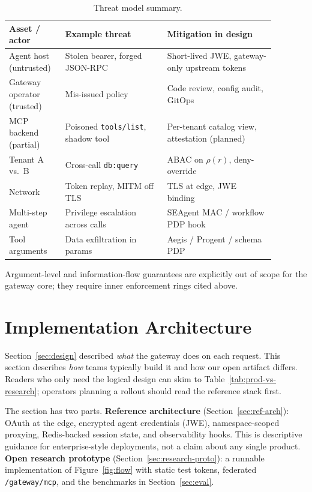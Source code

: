 \documentclass[11pt]{article}
\newcommand{\code}[1]{\texttt{#1}}
\newcommand{\aegis}{Aegis}
\newcommand{\seagent}{SEAgent}
\begin{document}
\begin{table}[H]
\centering
\caption{Threat model summary.}
\label{tab:threat}
\footnotesize
\begin{tabular}{@{}p{0.18\linewidth}p{0.34\linewidth}p{0.36\linewidth}@{}}
\toprule
Asset / actor & Example threat & Mitigation in design \\
\midrule
Agent host (untrusted) & Stolen bearer, forged JSON-RPC & Short-lived JWE, gateway-only upstream tokens \\
Gateway operator (trusted) & Mis-issued policy & Code review, config audit, GitOps \\
MCP backend (partial) & Poisoned \code{tools/list}, shadow tool & Per-tenant catalog view, attestation (planned) \\
Tenant A vs.\ B & Cross-call \code{db:query} & ABAC on $\rho(r)$, deny-override \\
Network & Token replay, MITM off TLS & TLS at edge, JWE binding \\
Multi-step agent & Privilege escalation across calls & \seagent{} MAC / workflow PDP hook \\
Tool arguments & Data exfiltration in params & \aegis{} / Progent / schema PDP \\
\bottomrule
\end{tabular}
\end{table}

Argument-level and information-flow guarantees are explicitly out of scope for the gateway core; they require inner enforcement rings cited above.

\section{Implementation Architecture}
\label{sec:engineering}

Section~\ref{sec:design} described \emph{what} the gateway does on each request.
This section describes \emph{how} teams typically build it and how our open artifact differs.
Readers who only need the logical design can skim to Table~\ref{tab:prod-vs-research}; operators planning a rollout should read the reference stack first.

The section has two parts.
\textbf{Reference architecture} (Section~\ref{sec:ref-arch}): OAuth at the edge, encrypted agent credentials (JWE), namespace-scoped proxying, Redis-backed session state, and observability hooks.
This is descriptive guidance for enterprise-style deployments, not a claim about any single product.
\textbf{Open research prototype} (Section~\ref{sec:research-proto}): a runnable implementation of Figure~\ref{fig:flow} with static test tokens, federated \code{/gateway/mcp}, and the benchmarks in Section~\ref{sec:eval}.
\end{document}
